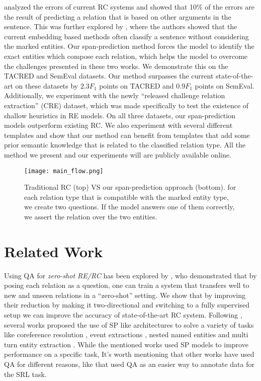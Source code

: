 \documentclass[11pt]{article}
\begin{document}
\citet{Alt2020} analyzed the errors of current RC systems and showed that 10\% of the errors are the result of predicting a relation that is based on other arguments in the sentence. This was further explored by \cite{Rosenman2020}, where the authors showed that the current embedding based methods often classify a sentence without considering the marked entities. Our span-prediction method forces the model to identify the exact entities which compose each relation, which helps the model to overcome the challenges presented in these two works. 
We demonstrate this on the TACRED and SemEval datasets. Our method surpasses the current state-of-the-art on these datasets by $2.3 F_1$ points on TACRED and $0.9 F_1$ points on SemEval. Additionally, we experiment with the newly ``released challenge relation extraction'' (CRE) dataset, which was made specifically to test the existence of shallow heuristics in RE models. On all three datasets, our span-prediction models outperform existing RC. We also experiment with several different templates and show that our method can benefit from templates that add some prior semantic knowledge that is related to the classified relation type. All the method we present and our experiments will are publicly available online.

\begin{figure*}[h]
\centering
\texttt{[image: main\_flow.png]}
\caption{Traditional RC (top) VS our span-prediction approach (bottom). for each relation type that is compatible with the marked entity type, we create two questions. If the model answers one of them correctly, we assert the relation over the two entities.} \label{fig:main}
\end{figure*}

\section{Related Work}
Using QA for \emph{zero-shot RE/RC} has been explored by \citet{Levy2017},
who demonstrated that by posing each relation as a question, one can train a system that transfers well to new and unseen relations in a ``zero-shot'' setting. We show that by improving their reduction by making it two-directional and switching to a fully supervised setup we can improve the accuracy of state-of-the-art RC system. Following \citet{Levy2017}, several works proposed the use of 
 SP like architectures to solve a variety of tasks like coreference resolution \cite{Wu2019}, event extractions \cite{Du2020}, nested named entities \cite{Li2019b} and multi turn entity extraction \cite{Li2019}.
While the mentioned works used SP models to improve performance on a specific task, It's worth mentioning that other works have used QA for different reasons, like \cite{He2015} that used QA as an easier way to annotate data for the SRL task.
\end{document}
